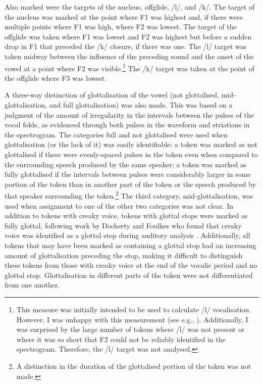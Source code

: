 \noindent Also marked were the targets of the nucleus, offglide, /l/, and /k/. The target of the nucleus was marked at the point where F1 was highest and, if there were multiple points where F1 was high, where F2 was lowest.  The target of the offglide was taken where F1 was lowest and F2 was highest but before a sudden drop in F1 that preceded the /k/ closure, if there was one.  The /l/ target was taken midway between the influence of the preceding sound and the onset of the vowel at a point where F2 was visible.\footnote{This measure was initially intended to be used to calculate /l/ vocalisation.  However, I was unhappy with this measurement (see e.g., ).  Additionally, I was surprised by the large number of tokens where /l/ was not present or where it was so short that F2 could not be reliably identified in the spectrogram.  Therefore, the /l/ target was not analysed.}  The /k/ target was taken at the point of the offglide where F3 was lowest. 

A three-way distinction of glottalisation of the vowel (not glottalised, mid-glottalisation, and full glottalisation) was also made.  This was based on a judgment of the amount of irregularity in the intervals between the pulses of the vocal folds, as evidenced through both pulses in the waveform and striations in the spectrogram.  The categories full and not glottalised were used when glottalisation (or the lack of it) was easily identifiable: a token was marked as not glottalised if there were evenly-spaced pulses in the token even when compared to the surrounding speech produced by the same speaker; a token was marked as fully glottalised if the intervals between pulses were considerably larger in some portion of the token than in another part of the token or the speech produced by that speaker surrounding the token.\footnote{A distinction in the duration of the glottalised portion of the token was not made.}  The third category, mid-glottalisation, was used when assignment to one of the other two categories was not clear.  In addition to tokens with creaky voice, tokens with glottal stops were marked as fully glottal, following work by Docherty and Foulkes who found that creaky voice was identified as a glottal stop during auditory analysis \cite{dochertyfoulkes1999}.  Additionally, all tokens that may have been marked as containing a glottal stop had an increasing amount of glottalisation preceding the stop, making it difficult to distinguish these tokens from those with creaky voice at the end of the vocalic period and no glottal stop.  Glottalisation in different parts of the token were not differentiated from one another.

